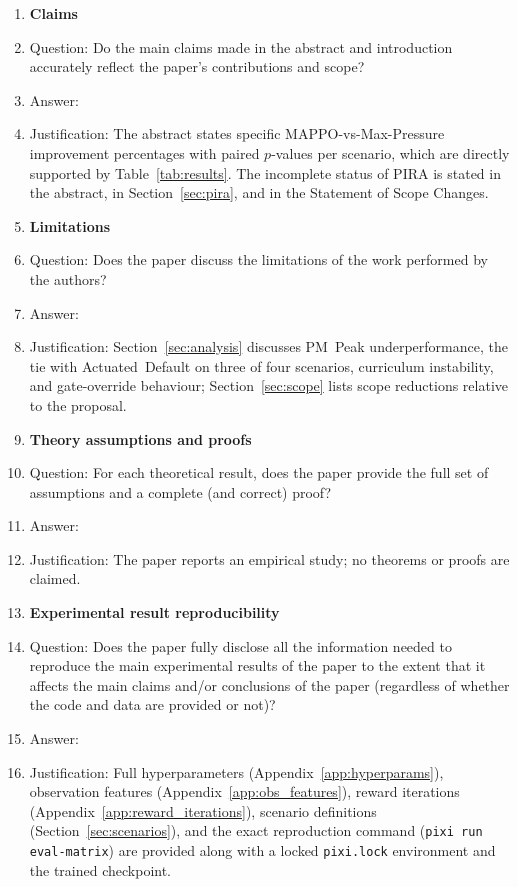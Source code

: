 \documentclass{article}
\begin{document}
\begin{enumerate}

\item {\bf Claims}
    \item[] Question: Do the main claims made in the abstract and introduction accurately reflect the paper's contributions and scope?
    \item[] Answer: \answerYes{}
    \item[] Justification: The abstract states specific MAPPO-vs-Max-Pressure improvement percentages with paired $p$-values per scenario, which are directly supported by Table~\ref{tab:results}. The incomplete status of PIRA is stated in the abstract, in Section~\ref{sec:pira}, and in the Statement of Scope Changes.

\item {\bf Limitations}
    \item[] Question: Does the paper discuss the limitations of the work performed by the authors?
    \item[] Answer: \answerYes{}
    \item[] Justification: Section~\ref{sec:analysis} discusses PM~Peak underperformance, the tie with Actuated~Default on three of four scenarios, curriculum instability, and gate-override behaviour; Section~\ref{sec:scope} lists scope reductions relative to the proposal.

\item {\bf Theory assumptions and proofs}
    \item[] Question: For each theoretical result, does the paper provide the full set of assumptions and a complete (and correct) proof?
    \item[] Answer: \answerNA{}
    \item[] Justification: The paper reports an empirical study; no theorems or proofs are claimed.

\item {\bf Experimental result reproducibility}
    \item[] Question: Does the paper fully disclose all the information needed to reproduce the main experimental results of the paper to the extent that it affects the main claims and/or conclusions of the paper (regardless of whether the code and data are provided or not)?
    \item[] Answer: \answerYes{}
    \item[] Justification: Full hyperparameters (Appendix~\ref{app:hyperparams}), observation features (Appendix~\ref{app:obs_features}), reward iterations (Appendix~\ref{app:reward_iterations}), scenario definitions (Section~\ref{sec:scenarios}), and the exact reproduction command (\texttt{pixi run eval-matrix}) are provided along with a locked \texttt{pixi.lock} environment and the trained checkpoint.


\end{enumerate}
\end{document}
